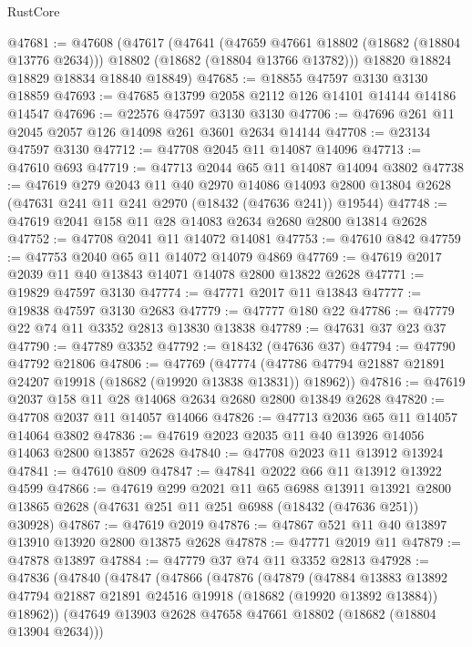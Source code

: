\begin{lexlean}{RustCore}
\begin{coremodule}
@47681 := @47608
    (@47617
      (@47641
        (@47659 @47661 @18802 (@18682 (@18804 @13776 @2634)))
        @18802
        (@18682 (@18804 @13766 @13782)))
      @18820
      @18824
      @18829
      @18834
      @18840
      @18849)
@47685 := @18855 @47597 @3130 @3130 @18859
@47693 := @47685 @13799 @2058 @2112 @126 @14101 @14144 @14186 @14547
@47696 := @22576 @47597 @3130 @3130
@47706 := @47696 @261 @11 @2045 @2057 @126 @14098 @261 @3601 @2634 @14144
@47708 := @23134 @47597 @3130
@47712 := @47708 @2045 @11 @14087 @14096
@47713 := @47610 @693
@47719 := @47713 @2044 @65 @11 @14087 @14094 @3802
@47738 := @47619
    @279
    @2043
    @11
    @40
    @2970
    @14086
    @14093
    @2800
    @13804
    @2628
    (@47631 @241 @11 @241 @2970 (@18432 (@47636 @241)) @19544)
@47748 := @47619 @2041 @158 @11 @28 @14083 @2634 @2680 @2800 @13814 @2628
@47752 := @47708 @2041 @11 @14072 @14081
@47753 := @47610 @842
@47759 := @47753 @2040 @65 @11 @14072 @14079 @4869
@47769 := @47619 @2017 @2039 @11 @40 @13843 @14071 @14078 @2800 @13822 @2628
@47771 := @19829 @47597 @3130
@47774 := @47771 @2017 @11 @13843
@47777 := @19838 @47597 @3130 @2683
@47779 := @47777 @180 @22
@47786 := @47779 @22 @74 @11 @3352 @2813 @13830 @13838
@47789 := @47631 @37 @23 @37
@47790 := @47789 @3352
@47792 := @18432 (@47636 @37)
@47794 := @47790 @47792 @21806
@47806 := @47769
    (@47774 (@47786 @47794 @21887 @21891 @24207 @19918 (@18682 (@19920 @13838 @13831)) @18962))
@47816 := @47619 @2037 @158 @11 @28 @14068 @2634 @2680 @2800 @13849 @2628
@47820 := @47708 @2037 @11 @14057 @14066
@47826 := @47713 @2036 @65 @11 @14057 @14064 @3802
@47836 := @47619 @2023 @2035 @11 @40 @13926 @14056 @14063 @2800 @13857 @2628
@47840 := @47708 @2023 @11 @13912 @13924
@47841 := @47610 @809
@47847 := @47841 @2022 @66 @11 @13912 @13922 @4599
@47866 := @47619
    @299
    @2021
    @11
    @65
    @6988
    @13911
    @13921
    @2800
    @13865
    @2628
    (@47631 @251 @11 @251 @6988 (@18432 (@47636 @251)) @30928)
@47867 := @47619 @2019
@47876 := @47867 @521 @11 @40 @13897 @13910 @13920 @2800 @13875 @2628
@47878 := @47771 @2019 @11
@47879 := @47878 @13897
@47884 := @47779 @37 @74 @11 @3352 @2813
@47928 := @47836
    (@47840
      (@47847
        (@47866
          (@47876
            (@47879
              (@47884
                @13883
                @13892
                @47794
                @21887
                @21891
                @24516
                @19918
                (@18682 (@19920 @13892 @13884))
                @18962))
            (@47649 @13903 @2628 @47658 @47661 @18802 (@18682 (@18804 @13904 @2634)))

\end{coremodule}
\end{lexlean}
